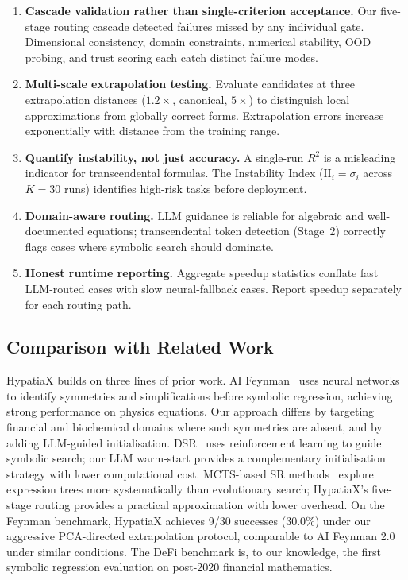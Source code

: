 \documentclass[twoside,11pt]{article}
\newcommand{\Rsq}{R^{2}}
\newcommand{\II}{\mathrm{II}}
\begin{document}
\begin{enumerate}
  \item \textbf{Cascade validation rather than single-criterion acceptance.} Our five-stage routing cascade detected failures missed by any individual gate. Dimensional consistency, domain constraints, numerical stability, OOD probing, and trust scoring each catch distinct failure modes.
  \item \textbf{Multi-scale extrapolation testing.} Evaluate candidates at three extrapolation distances ($1.2\times$, canonical, $5\times$) to distinguish local approximations from globally correct forms. Extrapolation errors increase exponentially with distance from the training range.
  \item \textbf{Quantify instability, not just accuracy.} A single-run $\Rsq$ is a misleading indicator for transcendental formulas. The Instability Index ($\II_i = \sigma_i$ across $K=30$ runs) identifies high-risk tasks before deployment.
  \item \textbf{Domain-aware routing.} LLM guidance is reliable for algebraic and well-documented equations; transcendental token detection (Stage~2) correctly flags cases where symbolic search should dominate.
  \item \textbf{Honest runtime reporting.} Aggregate speedup statistics conflate fast LLM-routed cases with slow neural-fallback cases. Report speedup separately for each routing path.
\end{enumerate}

\subsection{Comparison with Related Work}

HypatiaX builds on three lines of prior work. AI Feynman~\citep{udrescu2020feynman} uses neural networks to identify symmetries and simplifications before symbolic regression, achieving strong performance on physics equations. Our approach differs by targeting financial and biochemical domains where such symmetries are absent, and by adding LLM-guided initialisation. DSR~\citep{landajuela2022unified} uses reinforcement learning to guide symbolic search; our LLM warm-start provides a complementary initialisation strategy with lower computational cost. MCTS-based SR methods~\citep{sun2022symbolic} explore expression trees more systematically than evolutionary search; HypatiaX's five-stage routing provides a practical approximation with lower overhead. On the Feynman benchmark, HypatiaX achieves 9/30 successes (30.0\%) under our aggressive PCA-directed extrapolation protocol, comparable to AI Feynman 2.0 under similar conditions. The DeFi benchmark is, to our knowledge, the first symbolic regression evaluation on post-2020 financial mathematics.
\end{document}
